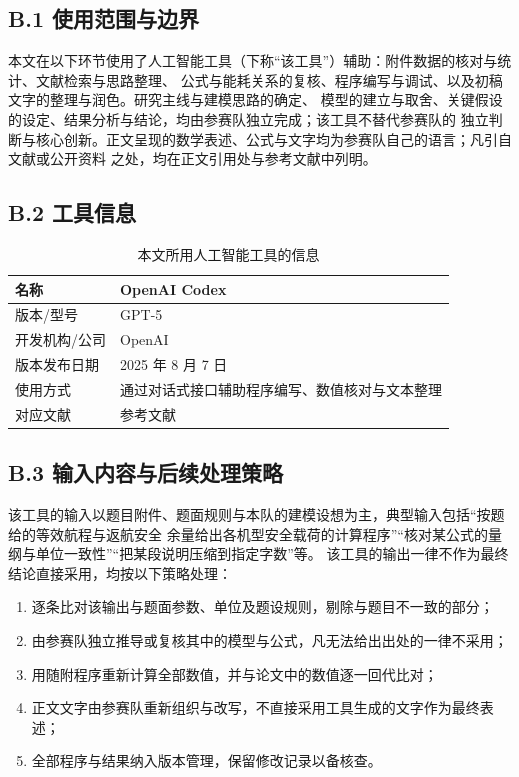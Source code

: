 \label{app:ai}
\subsection*{B.1 使用范围与边界}

本文在以下环节使用了人工智能工具（下称“该工具”）辅助：附件数据的核对与统计、文献检索与思路整理、
公式与能耗关系的复核、程序编写与调试、以及初稿文字的整理与润色。研究主线与建模思路的确定、
模型的建立与取舍、关键假设的设定、结果分析与结论，均由参赛队独立完成；该工具不替代参赛队的
独立判断与核心创新。正文呈现的数学表述、公式与文字均为参赛队自己的语言；凡引自文献或公开资料
之处，均在正文引用处与参考文献中列明。

\subsection*{B.2 工具信息}

\begin{table}[H]\centering
\begin{tabular}{ll}\toprule
名称 & OpenAI Codex \\ \midrule
版本/型号 & GPT-5 \\ \midrule
开发机构/公司 & OpenAI \\ \midrule
版本发布日期 & 2025 年 8 月 7 日 \\ \midrule
使用方式 & 通过对话式接口辅助程序编写、数值核对与文本整理 \\ \midrule
对应文献 & 参考文献\cite{codexai} \\ \bottomrule
\end{tabular}
\caption{本文所用人工智能工具的信息}
\label{tab:ai_tool}
\end{table}

\subsection*{B.3 输入内容与后续处理策略}

该工具的输入以题目附件、题面规则与本队的建模设想为主，典型输入包括“按题给的等效航程与返航安全
余量给出各机型安全载荷的计算程序”“核对某公式的量纲与单位一致性”“把某段说明压缩到指定字数”等。
该工具的输出一律不作为最终结论直接采用，均按以下策略处理：

\begin{enumerate}
  \item 逐条比对该输出与题面参数、单位及题设规则，剔除与题目不一致的部分；
  \item 由参赛队独立推导或复核其中的模型与公式，凡无法给出出处的一律不采用；
  \item 用随附程序重新计算全部数值，并与论文中的数值逐一回代比对；
  \item 正文文字由参赛队重新组织与改写，不直接采用工具生成的文字作为最终表述；
  \item 全部程序与结果纳入版本管理，保留修改记录以备核查。
\end{enumerate}

